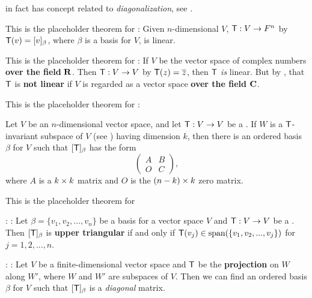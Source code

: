 \begin{note}
 in fact has concept related to \emph{diagonalization}, see .
\end{note}

\begin{additional theorem} \label{athm 2.16}
This is the placeholder theorem for : Given \(n\)-dimensional \(V\), \(\textsf{T} : V \to F^n\) by \(\textsf{T}(v) = [v]_{\beta}\), where \(\beta\) is a basis for \(V\), is linear.
\end{additional theorem}

\begin{additional theorem} \label{athm 2.17}
This is the placeholder theorem for :
If \(V\) be the vector space of complex numbers \textbf{over the field} \(\mathbf{R}\).
Then \(\textsf{T} : V \to V\) by \(\textsf{T}(z) = \overline{z}\), then \(\textsf{T}\) \emph{is} linear.
But by , that \(\textsf{T}\) is \textbf{not linear} if \(V\) is regarded as a vector space \textbf{over the field} \(\mathbf{C}\).

\end{additional theorem}

\begin{additional theorem} \label{athm 2.18}
This is the placeholder theorem for :

Let \(V\) be an \(n\)-dimensional vector space, and let \(\textsf{T} : V \to V\) be a \LTRAN{}.
If \(W\) is a \(\textsf{T}\)-invariant subspace of \(V\) (see ) having dimension \(k\), then there is an ordered basis \(\beta\) for \(V\) such that \([\textsf{T}]_{\beta}\) has the form
\[
    \begin{pmatrix} A & B \\ O & C \end{pmatrix},
\]
where \(A\) is a \(k \times k\) matrix and \(O\) is the \((n - k) \times k\) zero matrix.
\end{additional theorem}

\begin{additional theorem} \label{athm 2.19}
This is the placeholder theorem for

: : 
Let \(\beta = \{ v_1, v_2, ..., v_n \}\) be a basis for a vector space \(V\) and \(\textsf{T} : V \to V\) be a \LTRAN{}.
Then \([\textsf{T}]_{\beta}\) is \textbf{upper triangular} if and only if \(\textsf{T}(v_j) \in \operatorname{span}(\{ v_1, v_2, ..., v_j \})\) for \(j = 1, 2, ..., n\).

: :
Let \(V\) be a finite-dimensional vector space and \(\textsf{T}\) be the \textbf{projection} on \(W\) along \(W'\), where \(W\) and \(W'\) are subspaces of \(V\).
Then we can find an ordered basis \(\beta\) for \(V\) such that \([\textsf{T}]_{\beta}\) is a \emph{diagonal} matrix.
\end{additional theorem}

